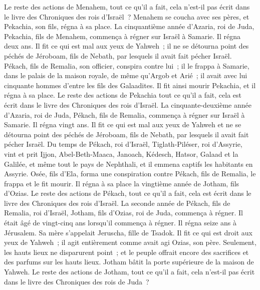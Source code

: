 \begin{multicols}{2}
Le reste des actions de Menahem, tout ce qu'il a fait, cela n'est-il pas écrit dans le livre des Chroniques des rois d'Israël~?
Menahem se coucha avec ses pères, et Pekachia, son fils, régna à sa place.
La cinquantième année d'Azaria, roi de Juda, Pekachia, fils de Menahem, commença à régner sur Israël à Samarie. Il régna deux ans.
Il fit ce qui est mal aux yeux de Yahweh~; il ne se détourna point des péchés de Jéroboam, fils de Nebath, par lesquels il avait fait pécher Israël.
Pékach, fils de Remalia, son officier, conspira contre lui~; il le frappa à Samarie, dans le palais de la maison royale, de même qu'Argob et Arié~; il avait avec lui cinquante hommes d'entre les fils des Galaadites. Il fit ainsi mourir Pekachia, et il régna à sa place.
Le reste des actions de Pekachia tout ce qu'il a fait, cela est écrit dans le livre des Chroniques des rois d'Israël.
La cinquante-deuxième année d'Azaria, roi de Juda, Pékach, fils de Remalia, commença à régner sur Israël à Samarie. Il régna vingt ans.
Il fit ce qui est mal aux yeux de Yahweh et ne se détourna point des péchés de Jéroboam, fils de Nebath, par lesquels il avait fait pécher Israël.
Du temps de Pékach, roi d'Israël, Tiglath-Piléser, roi d'Assyrie, vint et prit Ijjon, Abel-Beth-Maaca, Janoach, Kédesch, Hatsor, Galaad et la Galilée, et même tout le pays de Nephthali, et il emmena captifs les habitants en Assyrie.
Osée, fils d'Ela, forma une conspiration contre Pékach, fils de Remalia, le frappa et le fit mourir. Il régna à sa place la vingtième année de Jotham, fils d'Ozias.
Le reste des actions de Pékach, tout ce qu'il a fait, cela est écrit dans le livre des Chroniques des rois d'Israël.
La seconde année de Pékach, fils de Remalia, roi d'Israël, Jotham, fils d'Ozias, roi de Juda, commença à régner.
Il était âgé de vingt-cinq ans lorsqu'il commença à régner. Il régna seize ans à Jérusalem. Sa mère s'appelait Jeruscha, fille de Tsadok.
Il fit ce qui est droit aux yeux de Yahweh~; il agit entièrement comme avait agi Ozias, son père.
Seulement, les hauts lieux ne disparurent point~; et le peuple offrait encore des sacrifices et des parfums sur les hauts lieux. Jotham bâtit la porte supérieure de la maison de Yahweh.
Le reste des actions de Jotham, tout ce qu'il a fait, cela n'est-il pas écrit dans le livre des Chroniques des rois de Juda~?

\end{multicols}
